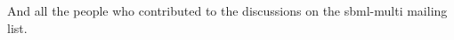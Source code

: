 And all the people who contributed to the discussions on the sbml-multi mailing list. 
\\
\\
\\
\\
\\
\\
\\
\\
\\
\\
\\
\\
